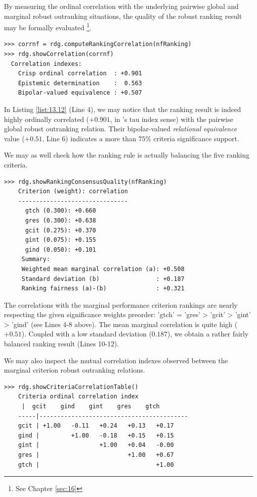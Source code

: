 By measuring the ordinal correlation with the underlying pairwise global and marginal robust outranking situations, the quality of the robust \NetFlows ranking result may be formally evaluated \footnote{See Chapter \ref{sec:16}}.  
\begin{lstlisting}[caption={Measuring the quality of the \NetFlows ranking result},label=list:13.12]
>>> corrnf = rdg.computeRankingCorrelation(nfRanking)
>>> rdg.showCorrelation(corrnf)   
  Correlation indexes:
    Crisp ordinal correlation  : +0.901
    Epistemic determination    :  0.563
    Bipolar-valued equivalence : +0.507
\end{lstlisting}
In Listing \ref{list:13.12} (Line 4), we may notice that the \NetFlows ranking result is indeed highly ordinally correlated ($+0.901$, in \Kendall 's tau index sense) with the pairwise global robust outranking relation. Their bipolar-valued \emph{relational equivalence}  value ($+0.51$, Line 6) indicates a more than $75\%$ criteria significance support.

We may as well check how the \NetFlows ranking rule is actually balancing the five ranking criteria.

\begin{lstlisting}
>>> rdg.showRankingConsensusQuality(nfRanking)
    Criterion (weight): correlation
    -------------------------------
      gtch (0.300): +0.660
      gres (0.300): +0.638
      gcit (0.275): +0.370
      gint (0.075): +0.155
      gind (0.050): +0.101
     Summary:
     Weighted mean marginal correlation (a): +0.508
     Standard deviation (b)                : +0.187
     Ranking fairness (a)-(b)              : +0.321
\end{lstlisting}

The correlations with the marginal performance criterion rankings are nearly respecting the given significance weights preorder: 'gtch' = 'gres' > 'gcit' > 'gint' > 'gind' (see Lines 4-8 above). The mean marginal correlation is quite high ($+0.51$). Coupled with a low standard deviation ($0.187$), we obtain a rather fairly balanced ranking result (Lines 10-12). 

We may also inspect the mutual correlation indexes observed between the marginal criterion robust outranking relations. 

\begin{lstlisting}
>>> rdg.showCriteriaCorrelationTable()
    Criteria ordinal correlation index
	 |  gcit    gind    gint    gres    gtch   
    -----|------------------------------------------
    gcit | +1.00   -0.11   +0.24   +0.13   +0.17   
    gind |         +1.00   -0.18   +0.15   +0.15   
    gint |                 +1.00   +0.04   -0.00   
    gres |                         +1.00   +0.67   
    gtch |                                 +1.00   
\end{lstlisting}

